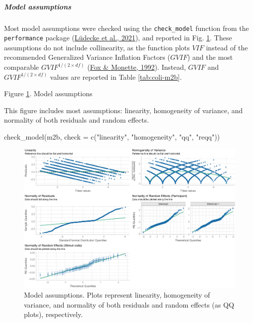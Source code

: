 \documentclass[
  bookmarksnumbered]{article}
\newenvironment{Shaded}{\begin{snugshade}}{\end{snugshade}}
\newcommand{\AttributeTok}[1]{\textcolor[rgb]{0.80,0.80,0.80}{#1}}
\newcommand{\FunctionTok}[1]{\textcolor[rgb]{0.94,0.94,0.56}{#1}}
\newcommand{\NormalTok}[1]{\textcolor[rgb]{0.80,0.80,0.80}{#1}}
\newcommand{\StringTok}[1]{\textcolor[rgb]{0.80,0.58,0.58}{#1}}
\begin{document}
\hypertarget{model-assumptions-2}{%
\subparagraph{Model assumptions}\label{model-assumptions-2}}

Most model assumptions were checked using the \texttt{check\_model} function from the \texttt{performance} package (\protect\hyperlink{ref-ludecke2021}{Lüdecke et al., 2021}), and reported in Fig. \ref{fig:assu-m2b}. These assumptions do not include collinearity, as the function plots \(VIF\) instead of the recommended Generalized Variance Inflation Factors (\(GVIF\)) and the most comparable \(GVIF^{{1}/{(2 \times df)}}\) (\protect\hyperlink{ref-fox1992}{Fox \& Monette, 1992}). Instead, \(GVIF\) and \(GVIF^{{1}/{(2 \times df)}}\) values are reported in Table \ref{tab:coli-m2b}.

Figure \ref{fig:assu-m2b}. Model assumptions

This figure includes most assumptions: linearity, homogeneity of variance, and normality of both residuals and random effects.

\begin{Shaded}
\begin{Highlighting}[]
\FunctionTok{check\_model}\NormalTok{(m2b,}
            \AttributeTok{check =} \FunctionTok{c}\NormalTok{(}\StringTok{"linearity"}\NormalTok{, }\StringTok{"homogeneity"}\NormalTok{, }\StringTok{"qq"}\NormalTok{, }\StringTok{"reqq"}\NormalTok{))}
\end{Highlighting}
\end{Shaded}

\begin{figure}
\centering
\includegraphics{Deseo_excitacion_sexual_files/figure-latex/assu-m2b-1.pdf}
\caption{\label{fig:assu-m2b}Model assumptions. Plots represent linearity, homogeneity of variance, and normality of both residuals and random effects (as QQ plots), respectively.}
\end{figure}
\end{document}
